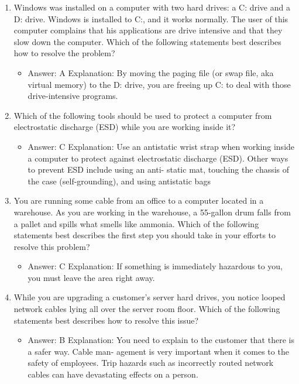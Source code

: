 \documentclass{article}
\begin{document}
\begin{enumerate}
    \item Windows was installed on a computer with two hard drives: a C:
drive and a D: drive. Windows is installed to C:, and it works normally.
The user of this computer complains that his applications are
drive intensive and that they slow down the computer. Which of the
following statements best describes how to resolve the problem?
    \begin{itemize}
        \item Answer: A
Explanation: By moving the paging file (or swap file, aka virtual memory) to the D:
drive, you are freeing up C: to deal with those drive-intensive programs.
    \end{itemize}
    \item Which of the following tools should be used to protect a computer
from electrostatic discharge (ESD) while you are working inside it?
    \begin{itemize}
        \item Answer: C
Explanation: Use an antistatic wrist strap when working inside a computer to protect
against electrostatic discharge (ESD). Other ways to prevent ESD include using an anti-
static mat, touching the chassis of the case (self-grounding), and using antistatic bags
    \end{itemize}
    \item You are running some cable from an office to a computer located
in a warehouse. As you are working in the warehouse, a 55-gallon
drum falls from a pallet and spills what smells like ammonia.
Which of the following statements best describes the first step you
should take in your efforts to resolve this problem?
    \begin{itemize}
        \item Answer: C
Explanation: If something is immediately hazardous to you, you must leave the area
right away.
    \end{itemize}
    \item While you are upgrading a customer’s server hard drives, you notice
looped network cables lying all over the server room floor. Which of
the following statements best describes how to resolve this issue?
    \begin{itemize}
        \item Answer: B
Explanation: You need to explain to the customer that there is a safer way. Cable man-
agement is very important when it comes to the safety of employees. Trip hazards such
as incorrectly routed network cables can have devastating effects on a person.

\end{itemize}
\end{enumerate}
\end{document}
